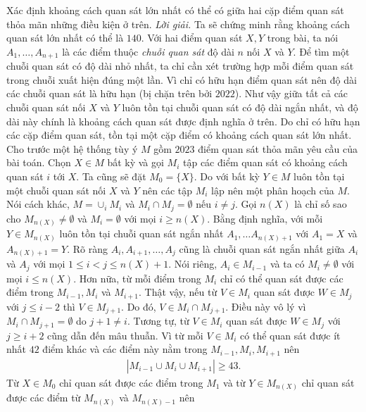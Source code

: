 \begin{multicols}{2}
	\vskip 0.1cm
	Xác định khoảng cách quan sát lớn nhất có thể có giữa hai cặp điểm quan sát thỏa mãn những điều kiện ở trên.
	\vskip 0.1cm
	\textit{Lời giải.}
	Ta sẽ chứng minh rằng khoảng cách quan sát lớn nhất có thể là $140$.
	\vskip 0.1cm	
	Với hai điểm quan sát $X,Y$ trong bài, ta nói $A_1, \ldots, A_{n+1}$ là các điểm thuộc \textit{chuỗi quan sát} độ dài $n$ nối $X$ và $Y$. Để tìm một chuỗi quan sát có độ dài nhỏ nhất, ta chỉ cần xét trường hợp mỗi điểm quan sát trong chuỗi xuất hiện đúng một lần. Vì chỉ có hữu hạn điểm quan sát nên độ dài các chuỗi quan sát là hữu hạn (bị chặn trên bởi $2022$). Như vậy giữa tất cả các chuỗi quan sát nối $X$ và $Y$ luôn tồn tại chuỗi quan sát có độ dài ngắn nhất, và độ dài này chính là khoảng cách quan sát được định nghĩa ở trên. Do chỉ có hữu hạn các cặp điểm quan sát, tồn tại một cặp điểm có khoảng cách quan sát lớn nhất.
	\vskip 0.1cm	
	Cho trước một hệ thống tùy ý $M$ gồm $2023$ điểm quan sát thỏa mãn yêu cầu của bài toán. Chọn $X \in M$ bất kỳ và gọi $M_i$ tập các điểm quan sát có khoảng cách quan sát $i$ tới $X$. Ta cũng sẽ đặt $M_0 = \{X\}$. Do với bất kỳ $Y \in M$ luôn tồn tại một chuỗi quan sát nối $X$ và $Y$ nên các tập $M_i$ lập nên một phân hoạch của $M$. Nói cách khác, $M = \cup_{i}M_i$ và $M_i \cap M_j = \emptyset$ nếu $i\neq j$.
	\vskip 0.1cm
	Gọi $n(X)$ là chỉ số sao cho $M_{n(X)} \neq \emptyset$ và $M_i = \emptyset$ với mọi $i \ge n(X)$. Bằng định nghĩa, với mỗi $Y \in M_{n(X)}$ luôn tồn tại chuỗi quan sát ngắn nhất $A_1, \ldots A_{n(X) + 1}$ với $A_1 = X$ và $A_{n(X)+1} = Y$. Rõ ràng $A_i, A_{i+1}, \ldots, A_{j}$ cũng là chuỗi quan sát ngắn nhất giữa $A_i$ và $A_j$ với mọi $1 \le i <j \le n(X) + 1$. Nói riêng, $A_i \in M_{i-1}$ và ta có $M_i \neq \emptyset$ với mọi $i \le n(X)$.
	\vskip 0.1cm	
	Hơn nữa, từ mỗi điểm trong $M_i$ chỉ có thể quan sát được các điểm trong $M_{i-1}, M_i$ và $M_{i+1}$. Thật vậy, nếu từ $V \in M_i$ quan sát được $W \in M_j$ với $j \le i-2$ thì $V \in M_{j+1}$. Do đó, $V \in M_i \cap M_{j+1}$. Điều này vô lý vì $M_i \cap M_{j+1} = \emptyset$ do $j+1 \neq i$. Tương tự, từ $V \in M_i$ quan sát được $W \in M_j$ với $j \ge i+2$ cũng dẫn đến mâu thuẫn. Vì từ mỗi $V \in M_i$ có thể quan sát được ít nhất $42$ điểm khác và các điểm này nằm trong $M_{i-1}, M_i, M_{i+1}$ nên
	\begin{align*}
		|M_{i-1} \cup M_i \cup M_{i+1}| \ge 43.
	\end{align*}
	Từ $X \in M_0$ chỉ quan sát được các điểm trong $M_1$ và từ $Y \in M_{n(X)}$ chỉ quan sát được các điểm từ $M_{n(X)}$ và $M_{n(X)-1}$ nên
	\begin{align*}

\end{align*}
\end{multicols}
